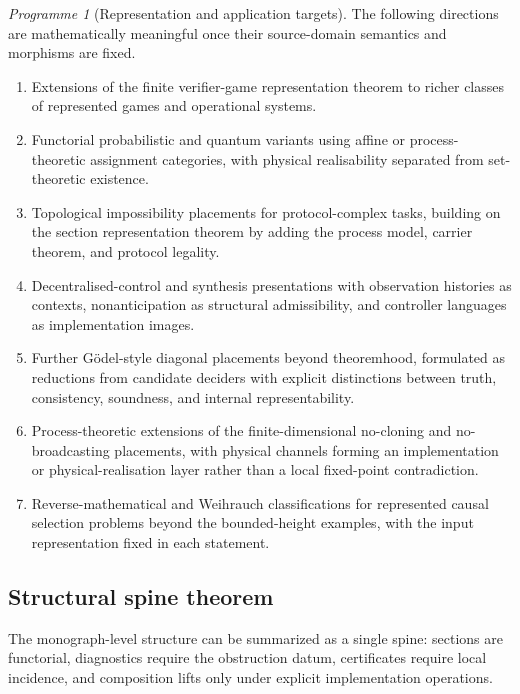 \documentclass[11pt]{article}
\theoremstyle{plain}
\theoremstyle{definition}
\theoremstyle{remark}
\newtheorem{programme}[theorem]{Programme}
\begin{document}
\begin{programme}[Representation and application targets]
\label{prog:monograph-targets}
The following directions are mathematically meaningful once their source-domain
semantics and morphisms are fixed.
\begin{enumerate}[label=(\roman*)]
\item Extensions of the finite verifier-game representation theorem to richer
classes of represented games and operational systems.
\item Functorial probabilistic and quantum variants using affine or process-theoretic
assignment categories, with physical realisability separated from set-theoretic
existence.
\item Topological impossibility placements for protocol-complex tasks, building on
the section representation theorem by adding the process model, carrier theorem,
and protocol legality.
\item Decentralised-control and synthesis presentations with observation histories
as contexts, nonanticipation as structural admissibility, and controller
languages as implementation images.
\item Further Gödel-style diagonal placements beyond theoremhood, formulated as
reductions from candidate deciders with explicit distinctions between truth,
consistency, soundness, and internal representability.
\item Process-theoretic extensions of the finite-dimensional no-cloning and
no-broadcasting placements, with physical channels forming an implementation or
physical-realisation layer rather than a local fixed-point contradiction.
\item Reverse-mathematical and Weihrauch classifications for represented causal
selection problems beyond the bounded-height examples, with the input
representation fixed in each statement.
\end{enumerate}
\end{programme}

\subsection{Structural spine theorem}

The monograph-level structure can be summarized as a single spine: sections are
functorial, diagnostics require the obstruction datum, certificates require local
incidence, and composition lifts only under explicit implementation operations.
\end{document}
